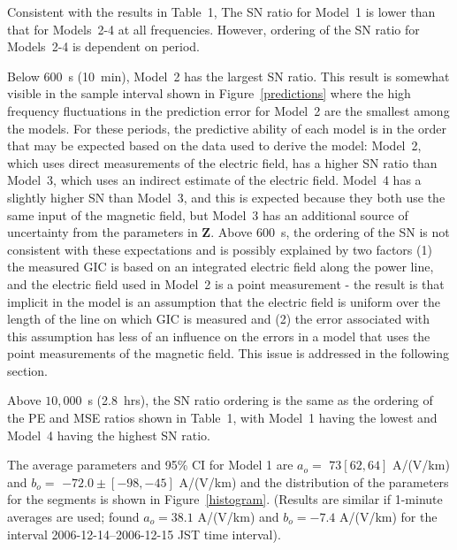\documentclass[draft,linenumbers]{agujournal2018}
\begin{document}
Consistent with the results in Table~1, The SN ratio for Model~1 is lower than that for Models~2-4 at all frequencies. However, ordering of the SN ratio for Models~2-4 is dependent on period. 

Below $600$~s (10~min), Model~2 has the largest SN ratio. This result is somewhat visible in the sample interval shown in Figure~\ref{predictions} where the high frequency fluctuations in the prediction error for Model~2 are the smallest among the models. For these periods, the predictive ability of each model is in the order that may be expected based on the data used to derive the model: Model~2, which uses direct measurements of the electric field, has a higher SN ratio than Model~3, which uses an indirect estimate of the electric field. Model~4 has a slightly higher SN than Model~3, and this is expected because they both use the same input of the magnetic field, but Model~3 has an additional source of uncertainty from the parameters in $\mathbf{Z}$. Above $600$~s, the ordering of the SN is not consistent with these expectations and is possibly explained by two factors (1) the measured GIC is based on an integrated electric field along the power line, and the electric field used in Model~2 is a point measurement - the result is that implicit in the model is an assumption that the electric field is uniform over the length of the line on which GIC is measured and (2) the error associated with this assumption has less of an influence on the errors in a model that uses the point measurements of the magnetic field. This issue is addressed in the following section.

Above $10,000$~s (2.8~hrs), the SN ratio ordering is the same as the ordering of the PE and MSE ratios shown in Table~1, with Model~1 having the lowest and Model~4 having the highest SN ratio. 

The average parameters and 95\% CI for Model 1 are $a_o = $ $73 [62,64]$ A/(V/km) and $b_o =$ $-72.0 \pm [-98,-45]$ A/(V/km) and the distribution of the parameters for the segments is shown in Figure~\ref{histogram}. (Results are similar if 1-minute averages are used; \cite{Watari2015} found $a_o=38.1$ A/(V/km) and $b_o=-7.4$ A/(V/km) for the interval 2006-12-14--2006-12-15 JST time interval). 
 
\end{document}
